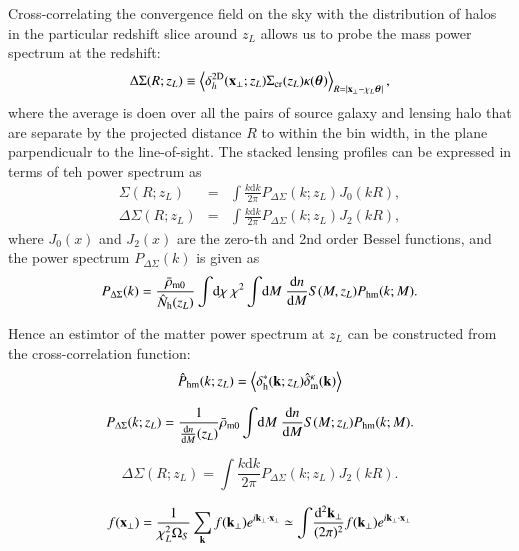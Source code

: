 \documentclass[onecolumn,notitlepage,showpacs,amsmath,amssymb,prd,floatfix]{revtex4-1}
\def\ave#1{\left\langle #1 \right\rangle}
\newcommand{\bx}{{\bf x}}
\newcommand{\bk}{{\bf k}}
\newcommand{\btheta}{{\bm{\theta}}}
\newcommand{\dr}{\mathrm{d}}
\newcommand{\deltah}{\delta_{\mathrm{h}}}
\newcommand{\phm}{P_{\mathrm{hm}}}
\newcommand{\bh}{\mathrm{h}}
\newcommand{\bnh}{\frac{\dr n}{\dr M}}
\newcommand{\sigmacr}{\Sigma_{\rm cr}}
\newcommand{\dsigma}{\Delta\Sigma}
\begin{document}
Cross-correlating the convergence field on the sky with the distribution
of halos in the particular redshift slice around $z_L$ allows us to
probe the mass power spectrum at the redshift:
%
\begin{equation}
\dsigma(R;z_L)\equiv \ave{\delta_h^{\rm 2D}(\bx_\perp;z_L)\sigmacr(z_L)\kappa(\btheta)}_{R=|\bx_\perp-\chi_L\btheta|},
\end{equation}
%
where the average is doen over all the pairs of source galaxy and
lensing halo that are separate by the projected distance $R$ to within
the bin width, in the plane parpendicualr to the line-of-sight. The
stacked lensing profiles can be expressed in terms of teh power spectrum
as
%
\begin{eqnarray}
 \Sigma(R;z_L)&=&\int\!\frac{k\dr k}{2\pi}P_{\dsigma}(k;z_L)J_0(kR),\nonumber\\
 \dsigma(R;z_L)&=&\int\!\frac{k\dr k}{2\pi}P_{\dsigma}(k;z_L)J_2(kR),
\end{eqnarray}
%
where $J_0(x)$ and $J_2(x)$ are the zero-th and 2nd order Bessel
functions, and the power spectrum $P_{\dsigma}(k)$ is given as
%
\begin{equation}
 P_{\dsigma}(k)=\frac{\bar{\rho}_{\rm m0}}{\hat{N}_\bh(z_L)}
  \int\!\dr\chi~\chi^2
  \int\!\dr M~\frac{\dr n}{\dr M}S(M,z_L)P_{\rm hm}(k;M).
\end{equation}


Hence an estimtor of the matter power spectrum at $z_L$ can be
constructed from the cross-correlation function:
%
\begin{equation}
\hat{P}_{\mathrm{hm}}(k;z_L)=\ave{\deltah^\ast(\bk;z_L)\hat{\delta}^\kappa_{\mathrm{m}}(\bk)}
\end{equation}
%




\begin{equation}
 P_{\dsigma}(k;z_L)=
  \frac{1}{\bnh(z_L)}\bar{\rho}_{\rm m0}
  \int\!\dr M~\frac{\dr n}{\dr M}S(M;z_L)
\phm(k;M).
\end{equation}

\begin{equation}
 \dsigma(R;z_L)=\int\!\frac{k\dr k}{2\pi}P_{\dsigma}(k;z_L)J_2(kR).
\end{equation}

\begin{equation}
f(\bx_\perp)=\frac{1}{\chi_L^2\Omega_S}\sum_{\bk}
 f(\bk_\perp)e^{i\bk_\perp\cdot\bx_\perp}
 \simeq \int\!\frac{\dr^2\bk_\perp}{(2\pi)^2}f(\bk_\perp)e^{i\bk_\perp\cdot\bx_\perp}
\end{equation}
\end{document}
